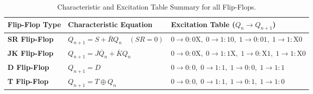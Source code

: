 \begin{table}[htbp]
\centering
\small
\begin{tabularx}{\textwidth}{lXl}
\toprule
\textbf{Flip-Flop Type} & \textbf{Characteristic Equation} & \textbf{Excitation Table ($Q_n \rightarrow Q_{n+1}$)} \\
\midrule
\textbf{SR Flip-Flop} & $Q_{n+1} = S + \overline{R}Q_n \quad (SR = 0)$ & $0\rightarrow 0: 0\text{X}, \; 0\rightarrow 1: 10, \; 1\rightarrow 0: 01, \; 1\rightarrow 1: \text{X}0$ \\
\textbf{JK Flip-Flop} & $Q_{n+1} = J\overline{Q}_n + \overline{K}Q_n$ & $0\rightarrow 0: 0\text{X}, \; 0\rightarrow 1: 1\text{X}, \; 1\rightarrow 0: \text{X}1, \; 1\rightarrow 1: \text{X}0$ \\
\textbf{D Flip-Flop} & $Q_{n+1} = D$ & $0\rightarrow 0: 0, \; 0\rightarrow 1: 1, \; 1\rightarrow 0: 0, \; 1\rightarrow 1: 1$ \\
\textbf{T Flip-Flop} & $Q_{n+1} = T \oplus Q_n$ & $0\rightarrow 0: 0, \; 0\rightarrow 1: 1, \; 1\rightarrow 0: 1, \; 1\rightarrow 1: 0$ \\
\bottomrule
\end{tabularx}
\caption{Characteristic and Excitation Table Summary for all Flip-Flops.}
\label{tab:rev-flipflops}
\end{table}


